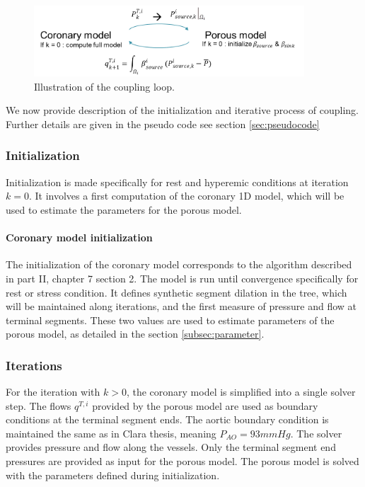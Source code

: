 \documentclass[a4paper, 11pt]{article} %
\begin{document}
\begin{figure}[hbtp]
\includegraphics[width = 0.9\textwidth]{Fig/CouplingLoopUpdate.png}
\caption{Illustration of the coupling loop.}
\label{fig:couplingloop}
\end{figure}

We now provide description of the initialization and iterative process of coupling. Further details are given in the pseudo code see section \ref{sec:pseudocode}

\subsubsection{Initialization}
Initialization is made specifically for rest and hyperemic conditions at iteration $k=0$. It involves a first computation of the coronary 1D model, which will be used to estimate the parameters for the porous model.

\paragraph{Coronary model initialization}
The initialization of the coronary model corresponds to the algorithm described in part II, chapter 7 section 2. 
The model is run until convergence specifically for rest or stress condition. It defines synthetic segment dilation in the tree, which will be maintained along iterations, and the first measure of pressure and flow at terminal segments. These two values are used to estimate parameters of the porous model, as detailed in the section \ref{subsec:parameter}.

\subsubsection{Iterations}
For the iteration with $k>0$, the coronary model is simplified into a single solver step.  
The flows $q^{T,i}$ provided by the porous model are used as boundary conditions at the terminal segment ends. The aortic boundary condition is maintained the same as in Clara thesis, meaning $P_{AO} = 93 mmHg$. The solver provides pressure and flow along the vessels. Only the terminal segment end pressures are provided as input for the porous model. 
The porous model is solved with the parameters defined during initialization.
\end{document}
